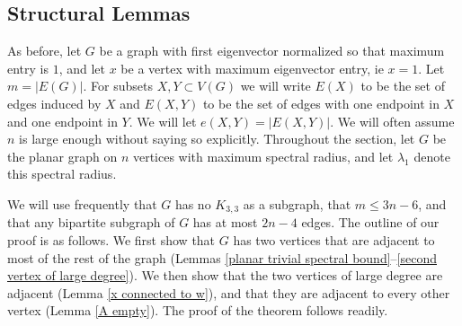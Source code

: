 \subsection{Structural Lemmas}

As before, let $G$ be a graph with first eigenvector normalized so that maximum entry is $1$, and let $x$ be a vertex with maximum eigenvector entry, ie $x=1$. Let $m = |E(G)|$. For subsets $X, Y\subset V(G)$ we will write $E(X)$ to be the set of edges induced by $X$ and $E(X,Y)$ to be the set of edges with one endpoint in $X$ and one endpoint in $Y$. We will let $e(X,Y) = |E(X,Y)|$. We will often assume $n$ is large enough without saying so explicitly. Throughout the section, let $G$ be the planar graph on $n$ vertices with maximum spectral radius, and let $\lambda_1$ denote this spectral radius.

We will use frequently that $G$ has no $K_{3,3}$ as a subgraph, that $m\leq 3n-6$, and that any bipartite subgraph of $G$ has at most $2n-4$ edges. The outline of our proof is as follows. We first show that $G$ has two vertices that are adjacent to most of the rest of the graph (Lemmas \ref{planar trivial spectral bound}--\ref{second vertex of large degree}). We then show that the two vertices of large degree are adjacent (Lemma \ref{x connected to w}), and that they are adjacent to every other vertex (Lemma \ref{A empty}). The proof of the theorem follows readily.

